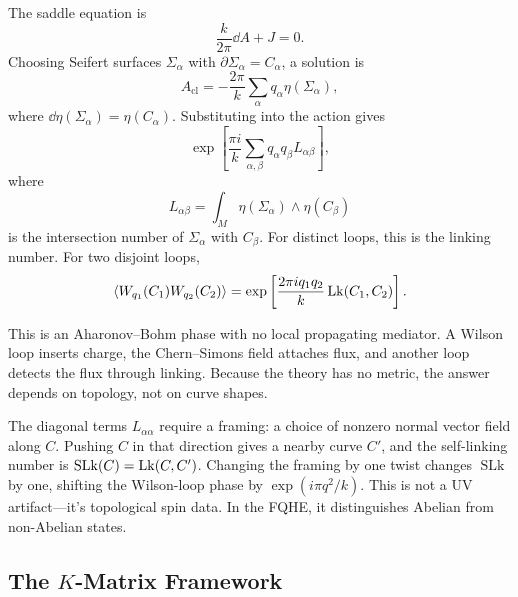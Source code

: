The saddle equation is
\begin{equation}
  \frac{k}{2\pi}\dd A+J=0.
  \label{eq:fqhe-gaussian-eom}
\end{equation}
Choosing Seifert surfaces $\Sigma_\alpha$ with $\partial\Sigma_\alpha=C_\alpha$, a solution is
\begin{equation}
  A_{\mathrm{cl}}
  =
  -\frac{2\pi}{k}
  \sum_\alpha q_\alpha\eta(\Sigma_\alpha),
  \label{eq:fqhe-A-classical}
\end{equation}
where $\dd\eta(\Sigma_\alpha)=\eta(C_\alpha)$. Substituting into the action gives
\begin{equation}
  \exp\left[
  \frac{\pi i}{k}
  \sum_{\alpha,\beta}
  q_\alpha q_\beta
  L_{\alpha\beta}
  \right],
  \label{eq:fqhe-linking-answer}
\end{equation}
where
\begin{equation}
  L_{\alpha\beta}
  =
  \int_M\eta(\Sigma_\alpha)\wedge\eta(C_\beta)
  \label{eq:fqhe-linking-intersection}
\end{equation}
is the intersection number of $\Sigma_\alpha$ with $C_\beta$. For distinct loops, this is the linking number. For two disjoint loops,
\begin{equation}
  \langle W_{q_1}(C_1)W_{q_2}(C_2)\rangle
  =
  \exp\left[
  \frac{2\pi iq_1q_2}{k}\operatorname{Lk}(C_1,C_2)
  \right].
  \label{eq:fqhe-two-loop-linking}
\end{equation}

This is an Aharonov--Bohm phase with no local propagating mediator. A Wilson loop inserts charge, the Chern--Simons field attaches flux, and another loop detects the flux through linking. Because the theory has no metric, the answer depends on topology, not on curve shapes.

The diagonal terms $L_{\alpha\alpha}$ require a framing: a choice of nonzero normal vector field along $C$. Pushing $C$ in that direction gives a nearby curve $C'$, and the self-linking number is $\operatorname{SLk}(C)=\operatorname{Lk}(C,C')$. Changing the framing by one twist changes $\operatorname{SLk}$ by one, shifting the Wilson-loop phase by $\exp(i\pi q^2/k)$. This is not a UV artifact—it's topological spin data. In the FQHE, it distinguishes Abelian from non-Abelian states.

\subsection{\texorpdfstring{The $K$-Matrix Framework}{The K-Matrix Framework}}
\label{subsec:fqhe-k-matrix}

